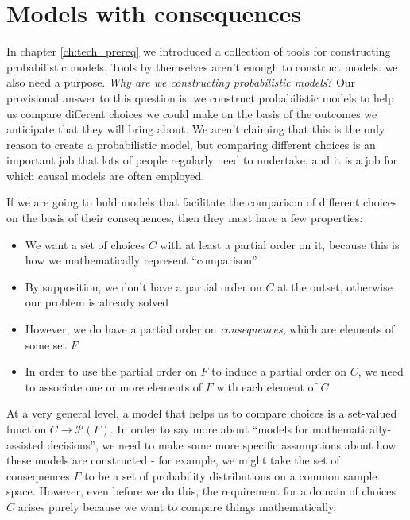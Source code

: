 

\chapter{Models with consequences}\label{ch:2p_statmodels}

In chapter \ref{ch:tech_prereq} we introduced a collection of tools for constructing probabilistic models. Tools by themselves aren't enough to construct models: we also need a purpose. \emph{Why are we constructing probabilistic models}? Our provisional answer to this question is: we construct probabilistic models to help us compare different choices we could make on the basis of the outcomes we anticipate that they will bring about. We aren't claiming that this is the only reason to create a probabilistic model, but comparing different choices is an important job that lots of people regularly need to undertake, and it is a job for which causal models are often employed.

If we are going to buld models that facilitate the comparison of different choices on the basis of their consequences, then they must have a few properties:

\begin{itemize}
    \item We want a set of choices $C$ with at least a partial order on it, because this is how we mathematically represent ``comparison''
    \item By supposition, we don't have a partial order on $C$ at the outset, otherwise our problem is already solved
    \item However, we do have a partial order on \emph{consequences}, which are elements of some set $F$
    \item In order to use the partial order on $F$ to induce a partial order on $C$, we need to associate one or more elements of $F$ with each element of $C$
\end{itemize}

At a very general level, a model that helps us to compare choices is a set-valued function $C\to \mathscr{P}(F)$. In order to say more about ``models for mathematically-assisted decisions'', we need to make some more specific assumptions about how these models are constructed - for example, we might take the set of consequences $F$ to be a set of probability distributions on a common sample space. However, even before we do this, the requirement for a domain of choices $C$ arises purely because we want to compare things mathematically.

